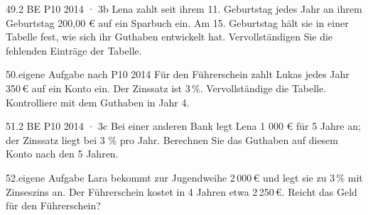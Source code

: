 \documentclass[11pt]{article}
\begin{document}
\begin{pfaufgabe}{49.}{2 BE \textperiodcentered{} P10 2014 · 3b}
Lena zahlt seit ihrem 11. Geburtstag jedes Jahr an ihrem Geburtstag 200,00 € auf ein Sparbuch ein. Am 15. Geburtstag hält sie in einer Tabelle fest, wie sich ihr Guthaben entwickelt hat. Vervollständigen Sie die fehlenden Einträge der Tabelle.
\par\smallskip\noindent {}\par
{}
\end{pfaufgabe}
\begin{pfaufgabe}{50.}{eigene Aufgabe nach P10 2014}
Für den Führerschein zahlt Lukas jedes Jahr 350\,€ auf ein Konto ein. Der Zinssatz ist 3\,\%. Vervollständige die Tabelle. Kontrolliere mit dem Guthaben in Jahr 4.
\par\smallskip\noindent {}\par
{}
\end{pfaufgabe}
\begin{pfaufgabe}{51.}{2 BE \textperiodcentered{} P10 2014 · 3c}
Bei einer anderen Bank legt Lena 1 000 € für 5 Jahre an; der Zinssatz liegt bei 3 \% pro Jahr. Berechnen Sie das Guthaben auf diesem Konto nach den 5 Jahren.
\end{pfaufgabe}
\begin{pfaufgabe}{52.}{eigene Aufgabe}
Lara bekommt zur Jugendweihe 2\,000\,€ und legt sie zu 3\,\% mit Zinseszins an. Der Führerschein kostet in 4 Jahren etwa 2\,250\,€. Reicht das Geld für den Führerschein?
\end{pfaufgabe}
\label{pruefstein}
\end{document}
